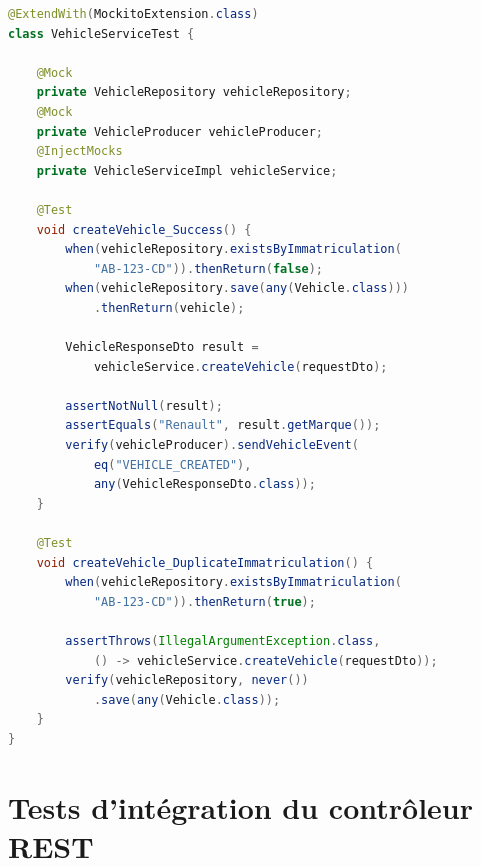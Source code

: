 \documentclass[12pt,a4paper]{report}
\begin{document}
\begin{lstlisting}[style=javastyle, language=Java, caption={Extrait de VehicleServiceTest.java}]
@ExtendWith(MockitoExtension.class)
class VehicleServiceTest {

    @Mock
    private VehicleRepository vehicleRepository;
    @Mock
    private VehicleProducer vehicleProducer;
    @InjectMocks
    private VehicleServiceImpl vehicleService;

    @Test
    void createVehicle_Success() {
        when(vehicleRepository.existsByImmatriculation(
            "AB-123-CD")).thenReturn(false);
        when(vehicleRepository.save(any(Vehicle.class)))
            .thenReturn(vehicle);

        VehicleResponseDto result =
            vehicleService.createVehicle(requestDto);

        assertNotNull(result);
        assertEquals("Renault", result.getMarque());
        verify(vehicleProducer).sendVehicleEvent(
            eq("VEHICLE_CREATED"),
            any(VehicleResponseDto.class));
    }

    @Test
    void createVehicle_DuplicateImmatriculation() {
        when(vehicleRepository.existsByImmatriculation(
            "AB-123-CD")).thenReturn(true);

        assertThrows(IllegalArgumentException.class,
            () -> vehicleService.createVehicle(requestDto));
        verify(vehicleRepository, never())
            .save(any(Vehicle.class));
    }
}
\end{lstlisting}

\section{Tests d'int\'egration du contr\^oleur REST}
\end{document}
